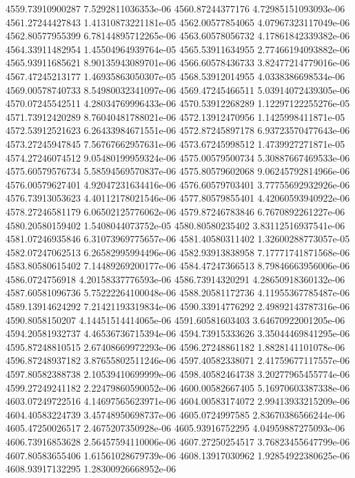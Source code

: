 {4559.73910900287 7.5292811036353e-06
4560.87244377176 4.72985151093093e-06
4561.27244427843 1.41310873221181e-05
4562.00577854065 4.07967323117049e-06
4562.80577955399 6.78144895712265e-06
4563.60578056732 4.17861842339382e-06
4564.33911482954 1.45504964939764e-05
4565.53911634955 2.77466194093882e-06
4565.93911685621 8.90135943089701e-06
4566.60578436733 3.82477214779016e-06
4567.47245213177 1.46935863050307e-05
4568.53912014955 4.0338386698534e-06
4569.00578740733 8.54980032341097e-06
4569.47245466511 5.03914072439305e-06
4570.07245542511 4.28034769996433e-06
4570.53912268289 1.12297122255276e-05
4571.73912420289 8.76040481788021e-06
4572.13912470956 1.1425998411871e-05
4572.53912521623 6.26433984671551e-06
4572.87245897178 6.93723570477643e-06
4573.27245947845 7.56767662957631e-06
4573.67245998512 1.4739927271871e-05
4574.27246074512 9.05480199959324e-06
4575.00579500734 5.30887667469533e-06
4575.60579576734 5.58594569570837e-06
4575.80579602068 9.06245792814966e-06
4576.00579627401 4.92047231634416e-06
4576.60579703401 3.77755692932926e-06
4576.73913053623 4.40112178021546e-06
4577.80579855401 4.42060593940922e-06
4578.27246581179 6.06502125776062e-06
4579.87246783846 6.7670892261227e-06
4580.20580159402 1.5408044073752e-05
4580.80580235402 3.83112516937541e-06
4581.07246935846 6.31073969775657e-06
4581.40580311402 1.32600288773057e-05
4582.07247062513 6.26582995994496e-06
4582.93913838958 7.17771741871568e-06
4583.80580615402 7.14489269200177e-06
4584.47247366513 8.79846663956006e-06
4586.0724756918 4.20158337776593e-06
4586.73914320291 4.28650918360132e-06
4587.60581096736 5.75222264100048e-06
4588.20581172736 4.11955367785487e-06
4589.13914624292 7.21421193319834e-06
4590.33914776292 2.49892143787316e-06
4590.8058150207 4.14451514414065e-06
4591.60581603403 3.64670922001205e-06
4594.20581932737 4.46536736715394e-06
4594.73915333626 3.35044469841295e-06
4595.87248810515 2.67408669972293e-06
4596.27248861182 1.8828141101078e-06
4596.87248937182 3.87655802511246e-06
4597.40582338071 2.41759677117557e-06
4597.80582388738 2.10539410699999e-06
4598.40582464738 3.20277965455774e-06
4599.27249241182 2.22479860590052e-06
4600.00582667405 5.16970603387338e-06
4603.07249722516 4.14697565623971e-06
4604.00583174072 2.99413933215209e-06
4604.40583224739 3.45748950698737e-06
4605.0724997585 2.83670386566244e-06
4605.47250026517 2.4675207350928e-06
4605.93916752295 4.04959887275093e-06
4606.73916853628 2.56457594110006e-06
4607.27250254517 3.76823455647799e-06
4607.80583655406 1.61561028679739e-06
4608.13917030962 1.92854922380625e-06
4608.93917132295 1.28300926668952e-06
}
